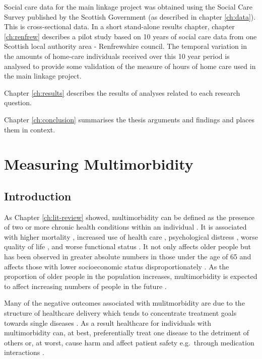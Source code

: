 \documentclass[12pt,]{report}
\begin{document}
Social care data for the main linkage project was obtained using the
Social Care Survey published by the Scottish Government (as described in
chapter \ref{ch:data}). This is cross-sectional data. In a short
stand-alone results chapter, chapter \ref{ch:renfrew} describes a pilot
study based on 10 years of social care data from one Scottish local
authority area - Renfrewshire council. The temporal variation in the
amounts of home-care individuals received over this 10 year period is
analysed to provide some validation of the measure of hours of home care
used in the main linkage project.

Chapter \ref{ch:results} describes the results of analyses related to
each research question.

Chapter \ref{ch:conclusion} summarises the thesis arguments and findings
and places them in context.

\FloatBarrier
\newpage
{}

\chapter{Measuring Multimorbidity}\label{ch:clustering}

\section{Introduction}\label{sec:clust-intro}

As Chapter \ref{ch:lit-review} showed, multimorbidity can be defined as
the presence of two or more chronic health conditions within an
individual \citep{RN226}. It is associated with higher mortality
\citep{RN81}, increased use of health care \citep{RN81, RN22},
psychological distress \citep{RN243}, worse quality of life
\citep{RN241, RN242}, and worse functional status \citep{RN40}. It not
only affects older people but has been observed in greater absolute
numbers in those under the age of 65 and affects those with lower
socioeconomic status disproportionately \citep{RN33}. As the proportion
of older people in the population increases, multimorbidity is expected
to affect increasing numbers of people in the future
\citep{RN155, RN288}.

Many of the negative outcomes associated with mulitmorbidity are due to
the structure of healthcare delivery which tends to concentrate
treatment goals towards single diseases \citep[\citet{RN290}]{RN155}. As
a result healthcare for individuals with multimorbidity can, at best,
preferentially treat one disease to the detriment of others or, at
worst, cause harm and affect patient safety e.g.~through medication
interactions \citep{RN289}.
\end{document}
